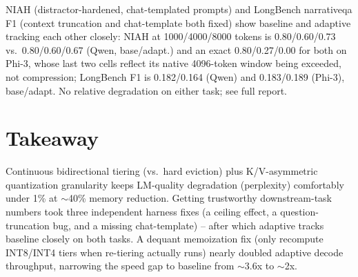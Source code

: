 \documentclass[9pt,twocolumn]{extarticle}
\begin{document}
NIAH (distractor-hardened, chat-templated prompts) and LongBench narrativeqa F1 (context
truncation and chat-template both fixed) show baseline and adaptive tracking each other
closely: NIAH at 1000/4000/8000 tokens is 0.80/0.60/0.73 vs.\ 0.80/0.60/0.67 (Qwen,
base/adapt.) and an exact 0.80/0.27/0.00 for both on Phi-3, whose last two cells reflect
its native 4096-token window being exceeded, not compression; LongBench F1 is
0.182/0.164 (Qwen) and 0.183/0.189 (Phi-3), base/adapt. No relative degradation on either
task; see full report.

\section{Takeaway}
Continuous bidirectional tiering (vs.\ hard eviction) plus K/V-asymmetric quantization
granularity keeps LM-quality degradation (perplexity) comfortably under 1\% at
$\sim$40\% memory reduction. Getting trustworthy downstream-task numbers took three
independent harness fixes (a ceiling effect, a question-truncation bug, and a missing
chat-template) -- after which adaptive tracks baseline closely on both tasks. A dequant
memoization fix (only recompute INT8/INT4 tiers when re-tiering actually runs) nearly
doubled adaptive decode throughput, narrowing the speed gap to baseline from
$\sim$3.6x to $\sim$2x.
\end{document}
